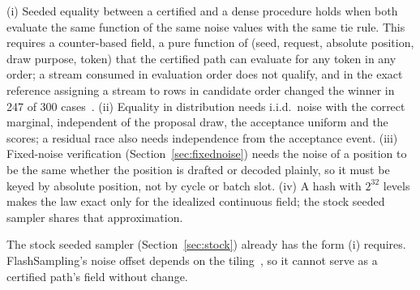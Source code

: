 \begin{proposition}\label{prop:rng}
(i) Seeded equality between a certified and a dense procedure holds when both evaluate the same function of the same noise values with the same tie rule. This requires a counter-based field, a pure function of (seed, request, absolute position, draw purpose, token) that the certified path can evaluate for any token in any order; a stream consumed in evaluation order does not qualify, and in the exact reference assigning a stream to rows in candidate order changed the winner in 247 of 300 cases~. (ii) Equality in distribution needs i.i.d.\ noise with the correct marginal, independent of the proposal draw, the acceptance uniform and the scores; a residual race also needs independence from the acceptance event. (iii) Fixed-noise verification (Section~\ref{sec:fixednoise}) needs the noise of a position to be the same whether the position is drafted or decoded plainly, so it must be keyed by absolute position, not by cycle or batch slot. (iv) A hash with $2^{32}$ levels makes the law exact only for the idealized continuous field; the stock seeded sampler shares that approximation.
\end{proposition}
The stock seeded sampler (Section~\ref{sec:stock}) already has the form (i) requires. FlashSampling's noise offset depends on the tiling~\cite{flashsampling}, so it cannot serve as a certified path's field without change.

